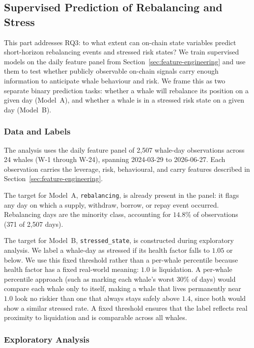 \subsection{Supervised Prediction of Rebalancing and Stress}
\label{sec:ml-supervised}

This part addresses RQ3: to what extent can on-chain state variables
predict short-horizon rebalancing events and stressed risk states? We
train supervised models on the daily feature panel from
Section~\ref{sec:feature-engineering} and use them to test whether
publicly observable on-chain signals carry enough information to
anticipate whale behaviour and risk. We frame this as two separate
binary prediction tasks: whether a whale will rebalance its position on a
given day (Model~A), and whether a whale is in a stressed risk state on a
given day (Model~B).

\subsubsection{Data and Labels}
\label{sec:ml-data}

The analysis uses the daily feature panel of 2{,}507 whale-day
observations across 24 whales (W-1 through W-24), spanning
2024-03-29 to 2026-06-27. Each observation carries the leverage,
risk, behavioural, and carry features described in
Section~\ref{sec:feature-engineering}.

The target for Model~A, \texttt{rebalancing}, is already present in the
panel: it flags any day on which a supply, withdraw, borrow, or repay
event occurred. Rebalancing days are the minority class, accounting for
$14.8\%$ of observations (371 of 2{,}507 days).

The target for Model~B, \texttt{stressed\_state}, is constructed during
exploratory analysis. We label a whale-day as stressed if its health
factor falls to $1.05$ or below. We use this fixed threshold rather than
a per-whale percentile because health factor has a fixed real-world
meaning: $1.0$ is liquidation. A per-whale percentile approach (such as
marking each whale's worst $30\%$ of days) would compare each whale only
to itself, making a whale that lives permanently near $1.0$ look no
riskier than one that always stays safely above $1.4$, since both would
show a similar stressed rate. A fixed threshold ensures that the label
reflects real proximity to liquidation and is comparable across all
whales.

\subsubsection{Exploratory Analysis}
\label{sec:ml-eda}

